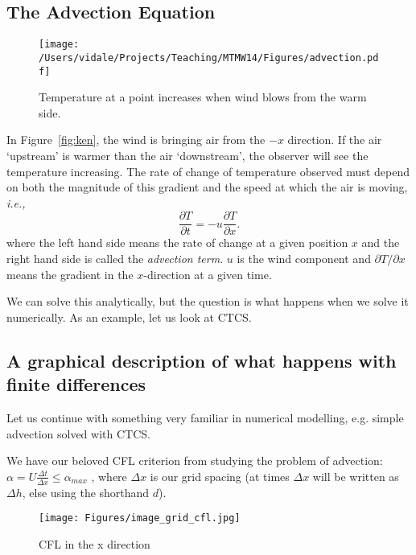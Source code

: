 \subsection{The Advection Equation}

\begin{figure}[h!]
	\begin{center}
		\texttt{[image: /Users/vidale/Projects/Teaching/MTMW14/Figures/advection.pdf]}
	\end{center}
	\caption{Temperature at a point increases when wind blows from the warm side.}
	\label{fig:kencfl}
\end{figure}


In Figure~\ref{fig:ken}, the wind is bringing air from the $-x$
direction. If the air `upstream' is warmer than the air `downstream',
the observer will see the temperature increasing. The rate of change of
temperature observed must depend on both the magnitude of this
gradient and the speed at which the air is moving, {\em i.e.,}
\begin{equation}
	\frac{\partial T}{\partial t} =- u \frac{\partial T}{\partial x}.
	\label{advectioncont}
\end{equation}
where the left hand side means the rate of change at a given position
$x$ and the right hand side is called the {\em advection term}. $u$ is
the wind component and $\partial T/\partial x$ means the gradient in
the $x$-direction at a given time. 

We can solve this analytically, but the question is what happens when we solve it numerically. As an example, let us look at CTCS.


\subsection{A graphical description of what happens with finite differences}

	Let us continue with something very familiar in numerical modelling, e.g. simple advection solved with CTCS.
		
	We have our beloved CFL criterion from studying the problem of advection:
	$\alpha = U \frac{\Delta t}{\Delta x} \le \alpha_{max}$
	, where $\Delta x$ is our grid spacing (at times $\Delta x$ will be written as $\Delta h$, else  using the shorthand $d$).\\

\begin{figure}[h!]
	\begin{center}
\texttt{[image: Figures/image\_grid\_cfl.jpg]}
	\end{center}
\caption{CFL in the x direction}
\end{figure}
	
